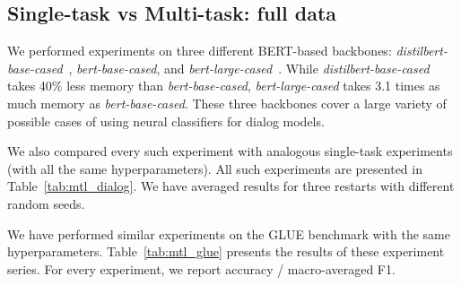 \subsection{Single-task vs Multi-task: full data}

We performed experiments on three different BERT-based backbones: \textit{distilbert-base-cased}~\cite{alina}, \textit{bert-base-cased}, and \textit{bert-large-cased}~\cite{bert}. While \textit{distilbert-base-cased} takes 40\% less memory than \textit{bert-base-cased}, \textit{bert-large-cased} takes 3.1 times as much memory as \textit{bert-base-cased}. These three backbones cover a large variety of possible cases of using neural classifiers for dialog models. %

We also compared every such experiment with analogous single-task experiments (with all the same hyperparameters). All such experiments are presented in Table~\ref{tab:mtl_dialog}. We have averaged results for three restarts with different random seeds.

We have performed similar experiments on the GLUE benchmark with the same hyperparameters.
Table~\ref{tab:mtl_glue} presents the results of these experiment series. For every experiment, we report accuracy / macro-averaged F1.

